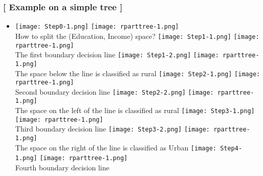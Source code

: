 \documentclass[xcolor=x11names,compress, aspectratio=169]{beamer}
\renewcommand{\(}{\begin{columns}}
\renewcommand{\)}{\end{columns}}
\newcommand{\<}[1]{\begin{column}{#1}}
\renewcommand{\>}{\end{column}}
\begin{document}
\begin{frame} %
\frametitle{\textcolor{brique}{[ Example on a simple tree ]}}
\begin{itemize}
\item[] %
    {\texttt{[image: Step0-1.png]} \texttt{[image: rparttree-1.png]}\\ }
    {How to split the (Education, Income) space?}
    {\texttt{[image: Step1-1.png]}  \texttt{[image: rparttree-1.png]}\\ }
    {The first boundary decision line}
    { \texttt{[image: Step1-2.png]}  \texttt{[image: rparttree-1.png]}\\ }
    {The space below the line is classified as  rural}
    {\texttt{[image: Step2-1.png]}  \texttt{[image: rparttree-1.png]}\\ }
    {Second boundary decision line}
    {\texttt{[image: Step2-2.png]}  \texttt{[image: rparttree-1.png]}\\ }
    {The space on the left of the line is classified as  rural}
    {\texttt{[image: Step3-1.png]}  \texttt{[image: rparttree-1.png]}\\ }
    {Third boundary decision line}
    {\texttt{[image: Step3-2.png]}  \texttt{[image: rparttree-1.png]}\\ }
    {The space on the right of the line is classified as  Urban}
    {\texttt{[image: Step4-1.png]}  \texttt{[image: rparttree-1.png]}\\ }
    {Fourth boundary decision line}
\end{itemize}
\end{frame}
\end{document}
